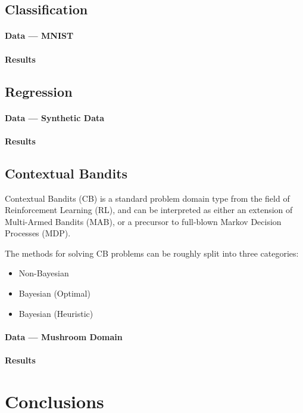 \documentclass[11pt]{article}
\begin{document}
\subsection{Classification}
\paragraph{Data --- MNIST}
\paragraph{Results}

\subsection{Regression}
\paragraph{Data --- Synthetic Data}
\paragraph{Results}

\subsection{Contextual Bandits}

Contextual Bandits (CB) is a standard problem domain type from the field of
Reinforcement Learning (RL), and can be interpreted as either an extension of
Multi-Armed Bandits (MAB), or a precursor to full-blown Markov Decision
Processes (MDP).






The methods for solving CB problems can be roughly split into three
categories:
%
\begin{itemize}
  \item Non-Bayesian
  \item Bayesian (Optimal)
  \item Bayesian (Heuristic)
\end{itemize}

\paragraph{Data --- Mushroom Domain}

\paragraph{Results}

\section{Conclusions}
\end{document}
